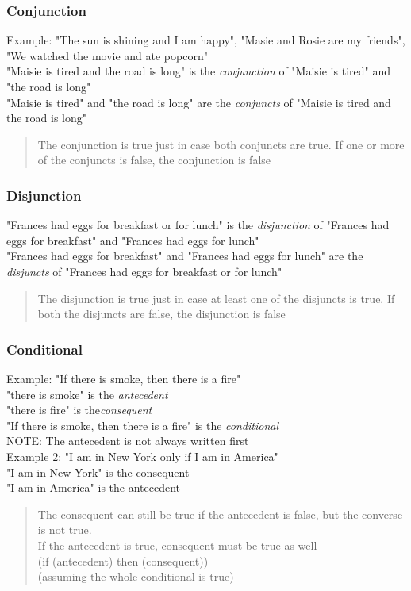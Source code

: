 \documentclass[]{article}
\begin{document}
\subsubsection{Conjunction}
Example: "The sun is shining and I am happy", "Masie and Rosie are my friends", "We watched the movie and ate popcorn"\\
"Maisie is tired and the road is long" is the \textit{conjunction} of "Maisie is tired" and "the road is long"\\
"Maisie is tired" and "the road is long" are the \textit{conjuncts} of "Maisie is tired and the road is long"
\begin{quote}
The conjunction is true just in case both conjuncts are true.
If one or more of the conjuncts is false, the conjunction is false
\end{quote}

\subsubsection{Disjunction}
"Frances had eggs for breakfast or for lunch" is the \textit{disjunction} of "Frances had eggs for breakfast"
and "Frances had eggs for lunch"\\
"Frances had eggs for breakfast" and "Frances had eggs for lunch" are the \textit{disjuncts} of 
"Frances had eggs for breakfast or for lunch"
\begin{quote}
The disjunction is true just in case at least one of the disjuncts is true.
If both the disjuncts are false, the disjunction is false
\end{quote}

\subsubsection{Conditional}
Example: "If there is smoke, then there is a fire"\\
"there is smoke" is the \textit{antecedent}\\
"there is fire" is the\textit{consequent}\\
"If there is smoke, then there is a fire" is the \textit{conditional}\\
NOTE: The antecedent is not always written first\\
Example 2: "I am in New York only if I am in America"\\
"I am in New York" is the consequent\\
"I am in America" is the antecedent
\begin{quote}
The consequent can still be true if the antecedent is false, but the converse is not true.\\
If the antecedent is true, consequent must be true as well\\(if (antecedent) then (consequent))\\
\hspace*{5pt}(assuming the whole conditional is true)
\end{quote}
\end{document}
